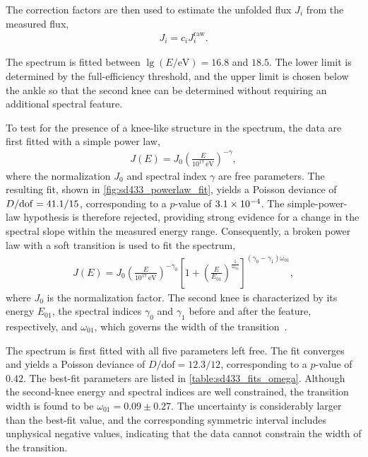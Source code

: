 \documentclass[main.tex]{subfiles}
\begin{document}
The correction factors are then used to estimate the unfolded flux $J_i$ from the measured flux,
\begin{align}
    J_i
    =
    c_i J_i^{\mathrm{raw}}.
\end{align}

The  spectrum is fitted between $\lg(E/\mathrm{eV})=16.8$ and $18.5$.
The lower limit is determined by the full-efficiency threshold, and the upper limit is chosen below the ankle so that the second knee can be determined without requiring an additional spectral feature.

To test for the presence of a knee-like structure in the spectrum, the data are first fitted with a simple power law,
\begin{align}
    J(E)
    =
    J_0
    \left(
        \frac{E}{10^{17}\,\mathrm{eV}}
    \right)^{-\gamma},
\end{align}
where the normalization $J_0$ and spectral index $\gamma$ are free parameters.
The resulting fit, shown in \cref{fig:sd433_powerlaw_fit}, yields a Poisson deviance of
$D/\mathrm{dof}=\num{41.1}/\num{15}$,
corresponding to a $p$-value of $\num{3.1e-4}$.
The simple-power-law hypothesis is therefore rejected, providing strong evidence for a change in the spectral slope within the measured energy range.
Consequently, a broken power law with a soft transition is used to fit the spectrum,
\begin{align}
    J(E)=J_0\left(
    \frac{E}{10^{17}\,\mathrm{eV}}
    \right)^{-\gamma_0}
    \left[
    1+\left(
    \frac{E}{E_{01}}
    \right)^{\frac{1}{\omega_{01}}}
    \right]^{(\gamma_0-\gamma_1)\omega_{01}},
    \label{eq:bplwst}
\end{align}
where $J_0$ is the normalization factor.
The second knee is characterized by its energy $E_{01}$, the spectral indices $\gamma_0$ and $\gamma_1$ before and after the feature, respectively, and $\omega_{01}$, which governs the width of the transition~\cite{PierreAuger:2021:InfillSpectrum}.

The spectrum is first fitted with all five parameters left free.
The fit converges and yields a Poisson deviance of
$D/\mathrm{dof}=12.3/12$, corresponding to a $p$-value of $0.42$.
The best-fit parameters are listed in \cref{table:sd433_fits_omega}.
Although the second-knee energy and spectral indices are well constrained, the transition width is found to be $\omega_{01}=0.09\pm0.27$.
The uncertainty is considerably larger than the best-fit value, and the corresponding symmetric interval includes unphysical negative values, indicating that the  data cannot constrain the width of the transition.
\end{document}
